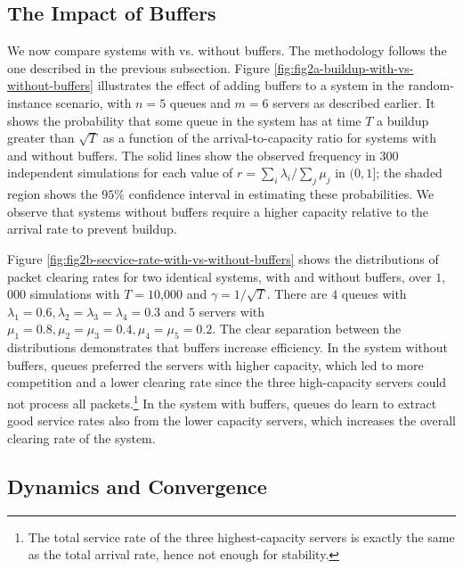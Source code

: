 \subsection{The Impact of Buffers}
We now compare systems with vs. without buffers. The methodology follows the one described in the previous subsection. Figure \ref{fig:fig2a-buildup-with-vs-without-buffers} illustrates the effect of adding buffers to a system in the random-instance scenario, with $n=5$ queues and $m=6$ servers as described earlier. It shows the probability that some queue in the system has at time $T$ a buildup greater than $\sqrt{T}$ as a function of the arrival-to-capacity ratio for systems with and without buffers. The solid lines show the observed frequency in $300$ independent simulations for each value of $r = \sum_i \lambda_i/\sum_j \mu_j$ in $(0, 1]$; the shaded region shows 
the $95\%$ confidence interval in estimating these probabilities. We observe that systems without buffers require a higher capacity relative to the arrival rate to prevent buildup.

Figure \ref{fig:fig2b-secvice-rate-with-vs-without-buffers} shows the 
distributions of packet clearing rates for two identical systems, with and without buffers, over $1$,$000$ simulations with $T=10$,$000$ and $\gamma = 1/\sqrt{T}$. There are $4$ queues with $\lambda_1 = 0.6, \lambda_2 = \lambda_3 = \lambda_4 = 0.3$ and $5$ servers with $\mu_1 = 0.8, \mu_2 = \mu_3 = 0.4, \mu_4 = \mu_5 = 0.2$. The clear separation between the distributions demonstrates that buffers increase efficiency. In the system without buffers, 
queues preferred the servers with higher capacity, which led to more competition and a lower clearing rate since the three high-capacity servers could not process all packets.\footnote{The total service rate of the three highest-capacity servers is exactly the same as the total arrival rate, hence not enough for stability.} In the system with buffers, queues do learn to extract good service rates also from the lower capacity servers, which increases the overall clearing rate of the system. 


\subsection{Dynamics and Convergence}

